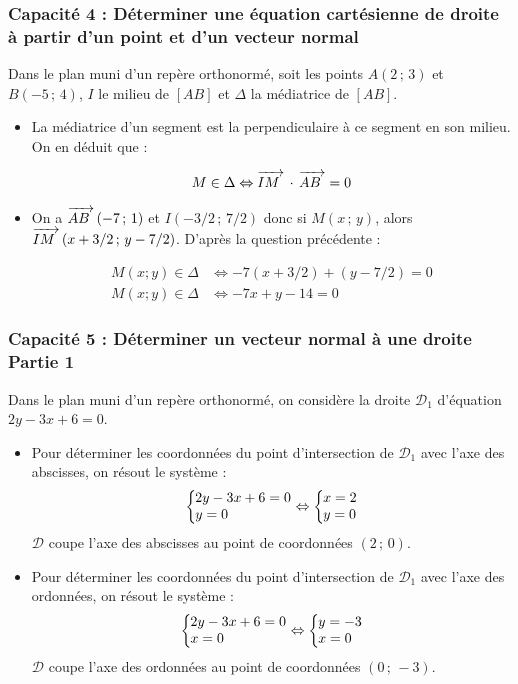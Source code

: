 \documentclass[11pt, hyperref={urlcolor=red,%
            linkcolor=blue, %
            colorlinks=true}]{beamer}
\newcommand{\Coord}[2]{\left(#1\, ;\, #2\right)}
\newcommand{\vect}[1]{\mathchoice%
{\overrightarrow{\displaystyle\mathstrut#1\,\,}}%
{\overrightarrow{\textstyle\mathstrut#1\,\,}}%
{\overrightarrow{\scriptstyle\mathstrut#1\,\,}}%
{\overrightarrow{\scriptscriptstyle\mathstrut#1\,\,}}}
\newcommand{\sys}[2]{
\left\lbrace
 \begin{array}{l}
  \negthickspace\negthickspace #1\\
  \negthickspace\negthickspace #2\\
 \end{array}
\right.\negthickspace\negthickspace}
\begin{document}
\begin{frame}
\label{capacite4}
\frametitle{Capacité 4 : Déterminer une équation cartésienne de droite à partir d'un point et d'un vecteur normal}

Dans le plan muni d'un repère orthonormé, soit les points $A\Coord{2}{3}$ et $B\Coord{-5}{4}$, $I$ le milieu de $[AB]$ et $\Delta$ la médiatrice de $[AB]$.


\begin{itemize}
\pause \item  La médiatrice d'un segment est la perpendiculaire à ce segment en son milieu. On en déduit que :

\begin{align*}
M \in \Delta &\Leftrightarrow \vect{IM} \, \cdot \, \vect{AB}=0 \\
\end{align*}

\pause \item On a $\vect{AB}\Coord{-7}{1}$ et $I\Coord{-3/2}{7/2}$ donc si $M\Coord{x}{y}$, alors $\vect{IM}\Coord{x+3/2}{y-7/2}$.
D'après la question précédente :

\begin{align*}
M(x;y) \in \Delta &\Leftrightarrow -7(x+3/2)+(y-7/2)=0 \\
M(x;y) \in \Delta &\Leftrightarrow -7x+y-14=0
\end{align*}


\end{itemize}
\end{frame}


\begin{frame}
\label{capacite5}
\frametitle{Capacité 5 : Déterminer un vecteur normal à une droite Partie 1}

Dans le plan muni d'un repère orthonormé, on considère la droite $\mathcal{D}_{1}$ d'équation $2y-3x+6=0$.


\begin{itemize}
\pause \item  Pour déterminer les coordonnées du point d'intersection de $\mathcal{D}_{1}$ avec l'axe des abscisses, on résout le système :
$$\sys{2y-3x+6=0}{y=0} \Leftrightarrow \sys{x=2}{y=0}$$
$\mathcal{D}$ coupe l'axe des abscisses au point de coordonnées $\Coord{2}{0}$.
\pause \item  Pour déterminer les coordonnées du point d'intersection de $\mathcal{D}_{1}$ avec l'axe des ordonnées, on résout le système :
$$\sys{2y-3x+6=0}{x=0} \Leftrightarrow \sys{y=-3}{x=0}$$
$\mathcal{D}$ coupe l'axe des ordonnées au point de coordonnées $\Coord{0}{-3}$.
\end{itemize}
\end{frame}
\end{document}
